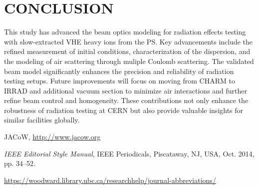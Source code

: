 \documentclass[a4paper,
               biblatex,     %
               ]{jacow}
\begin{document}






\section{CONCLUSION}

This study has advanced the beam optics modeling for radiation effects testing with slow-extracted VHE heavy ions from the PS. Key advancements include the refined measurement of initial conditions, characterization of the dispersion, and the modeling of air scattering through muliple Coulomb scattering. The validated beam model significantly enhances the precision and reliability of radiation testing setups. Future improvements will focus on moving from CHARM to IRRAD and additional vacuum section to minimize air interactions and further refine beam control and homogeneity. These contributions not only enhance the robustness of radiation testing at CERN but also provide valuable insights for similar facilities globally.


%
	{\printbibliography}%
	{%
	
	\begin{thebibliography}{9} %
	
		JACoW,
		\url{http://www.jacow.org}
	
		\textit{IEEE Editorial Style Manual},
		IEEE Periodicals, Piscataway,
		NJ, USA, Oct. 2014, pp. 34--52.

	\url{https://woodward.library.ubc.ca/researchhelp/journal-abbreviations/}

	\end{thebibliography}
} %
\end{document}
